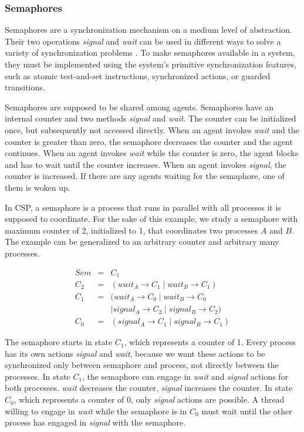 \subsubsection*{Semaphores}

Semaphores are a synchronization mechanism on a medium level of abstraction.
Their two operations \emph{signal} and \emph{wait} can be used in different ways to solve a variety of synchronization problems \cite{books/Downey08LBOS}.
To make semaphores available in a system, they must be implemented using the system's primitive synchronization features, such as atomic test-and-set instructions, synchronized actions, or guarded transitions.

Semaphores are supposed to be shared among agents.
Semaphores have an internal counter and two methods \emph{signal} and \emph{wait}.
The counter can be initialized once, but subsequently not accessed directly.
When an agent invokes \emph{wait} and the counter is greater than zero, the semaphore decreases the counter and the agent continues.
When an agent invokes \emph{wait} while the counter is zero, the agent blocks and has to wait until the counter increases.
When an agent invokes \emph{signal}, the counter is increased.
If there are any agents waiting for the semaphore, one of them is woken up.

In CSP, a semaphore is a process that runs in parallel with all processes it is supposed to coordinate.
For the sake of this example, we study a semaphore with maximum counter of 2, initialized to 1, that coordinates two processes $A$ and $B$.
The example can be generalized to an arbitrary counter and arbitrary many processes.

\begin{equation*}
  \begin{array}{rcl}
  Sem & = & C_1 \\
  C_2 & = & (wait_A \to C_1 \mid wait_B \to C_1) \\
  C_1 & = & (wait_A \to C_0 \mid wait_B \to C_0 \\
      &   & \mid signal_A \to C_2 \mid signal_B \to C_2) \\
  C_0 & = & (signal_A \to C_1 \mid signal_B \to C_1)
  \end{array}
\end{equation*}

The semaphore starts in state $C_1$, which represents a counter of 1.
Every process has its own actions \emph{signal} and \emph{wait}, because we want these actions to be synchronized only between semaphore and process, not directly between the processes.
In state $C_1$, the semaphore can engage in \emph{wait} and \emph{signal} actions for both processes.
\emph{wait} decreases the counter, \emph{signal} increases the counter.
In state $C_0$, which represents a counter of 0, only \emph{signal} actions are possible.
A thread willing to engage in \emph{wait} while the semaphore is in $C_0$ must wait until the other process has engaged in \emph{signal} with the semaphore.


